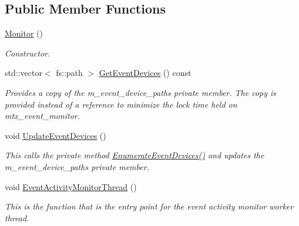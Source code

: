 \subsection*{Public Member Functions}
\begin{DoxyCompactItemize}
\item 
\mbox{\label{classEventDetect_1_1Monitor_a639d27b16055d8681c2015d00ea083d8}} 
\mbox{\hyperlink{classEventDetect_1_1Monitor_a639d27b16055d8681c2015d00ea083d8}{Monitor}} ()
\begin{DoxyCompactList}\small\item\em Constructor. \end{DoxyCompactList}\item 
std\+::vector$<$ fs\+::path $>$ \mbox{\hyperlink{classEventDetect_1_1Monitor_ae8da256174cfe6eab25421dc1d2673d7}{Get\+Event\+Devices}} () const
\begin{DoxyCompactList}\small\item\em Provides a copy of the m\+\_\+event\+\_\+device\+\_\+paths private member. The copy is provided instead of a reference to minimize the lock time held on mtx\+\_\+event\+\_\+monitor. \end{DoxyCompactList}\item 
\mbox{\label{classEventDetect_1_1Monitor_a3109186021afae63d02df1bf73bbcc2f}} 
void \mbox{\hyperlink{classEventDetect_1_1Monitor_a3109186021afae63d02df1bf73bbcc2f}{Update\+Event\+Devices}} ()
\begin{DoxyCompactList}\small\item\em This calls the private method \mbox{\hyperlink{classEventDetect_1_1Monitor_a46b24be7323eaa4f6e396d14108aea6e}{Enumerate\+Event\+Devices()}} and updates the m\+\_\+event\+\_\+device\+\_\+paths private member. \end{DoxyCompactList}\item 
\mbox{\label{classEventDetect_1_1Monitor_a598a9da26f5c2970d9b618bbc7b66322}} 
void \mbox{\hyperlink{classEventDetect_1_1Monitor_a598a9da26f5c2970d9b618bbc7b66322}{Event\+Activity\+Monitor\+Thread}} ()
\begin{DoxyCompactList}\small\item\em This is the function that is the entry point for the event activity monitor worker thread. \end{DoxyCompactList}\item 

\end{DoxyCompactItemize}
